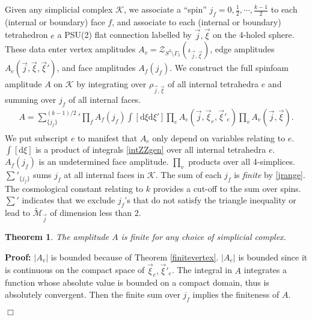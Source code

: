 \documentclass[aps,prd,notitlepage,nofootinbib,superscriptaddress,groupedaddress,twocolumn]{revtex4-1}
\newtheorem{theorem}{Theorem}[section]
\newtheorem{corollary}{Corollary}[theorem]
\def\be{\begin{eqnarray}}
\def\ee{\end{eqnarray}}
\newcommand{\ck}{\mathcal K}
\newcommand{\cm}{\mathcal M}
\newcommand{\rmd}{\mathrm d}
\begin{document}
Given any simplicial complex $\ck$, we associate a ``spin'' $j_f=0,\frac{1}{2},\cdots,\frac{k-1}{2}$ to each (internal or boundary) face $f$, and associate to each (internal or boundary) tetrahedron $e$ a PSU(2) flat connection labelled by ${\vec{j},\vec{\xi}}$ on the 4-holed sphere. These data enter vertex amplitudes $A_v=\mathcal{Z}_{S^{3} \setminus \Gamma_{5}}(\iota_{\vec{j}, \vec{\xi}})$, edge amplitudes $A_e(\vec{j},\vec{\xi},\vec{\xi}')$, and face amplitudes $A_f(j_f)$. We construct the full spinfoam amplitude $A$ on $\ck$ by integrating over $\rho_{\vec{j},\vec{\xi}}$ of all internal tetrahedra $e$ and summing over $j_f$ of all internal faces.
\be
A=\!\!\!\sum_{\{j_f\}}^{(k-1)/2}\!\!\!\!\!{}'\prod_fA_f(j_f)\int[\rmd \xi\rmd\xi']\prod_{e} A_e(\vec{j},\vec{\xi}_e,\vec{\xi}'_e)\prod_vA_v(\vec{j},\vec{\xi}).\nonumber
\label{fullamplitudeA}\\
\ee
We put subscript $e$ to manifest that $A_e$ only depend on variables relating to $e$. $\int[\rmd \xi]$ is a product of integrals \eqref{intZZgen} over all internal tetrahedra $e$. $A_f(j_f)$ is an undetermined face amplitude. $\prod_v$ products over all 4-simplices. $\sum{}'_{\{j_f\}}$ sums $j_f$ at all internal faces in $\ck$. The sum of each $j_f$ is \emph{finite} by \eqref{jrange}. The cosmological constant relating to $k$ provides a cut-off to the sum over spins. $\sum{}'$ indicates that we exclude $j_f$'s that do not satisfy the triangle inequality or lead to $\widetilde{\cm}_{\vec{j}}$ of dimension less than 2. 

 
\begin{theorem}

The amplitude $A$ is finite for any choice of simplicial complex.

\end{theorem}
 
\textbf{Proof:} $|A_v|$ is bounded because of Theorem \ref{finitevertex}. $|A_e|$ is bounded since it is continuous on the compact space of $\vec{\xi}_e,\vec{\xi}'_e$. The integral in $A$ integrates a function whose absolute value is bounded on a compact domain, thus is absolutely convergent. Then the finite sum over $j_f$ implies the finiteness of $A$.

$\Box$



\end{document}

